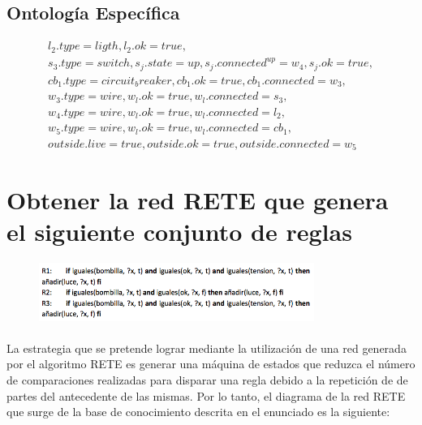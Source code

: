 \documentclass[10pt, a4paper,spanish]{article}
\begin{document}
		\subsection{Ontología Específica}

			\begin{equation*}
				\begin{split}
					l_2.type=ligth, l_2.ok=true, \\
					s_3.type=switch, s_j.state=up, s_j.connected^{up}=w_4, s_j.ok=true, \\
					cb_1.type=circuit_breaker, cb_1.ok=true, cb_1.connected=w_3, \\
					w_3.type=wire, w_l.ok=true, w_l.connected=s_3, \\
					w_4.type=wire, w_l.ok=true, w_l.connected=l_2, \\
					w_5.type=wire, w_l.ok=true, w_l.connected=cb_1, \\
					outside.live=true, outside.ok=true, outside.connected=w_5
				\end{split}
			\end{equation*}

	\section{Obtener la red RETE que genera el siguiente conjunto de reglas}

		\begin{figure}[H]
			\begin{center}
				\includegraphics[width=0.8\textwidth]{rete-exercise}
			\end{center}
		\end{figure}

		\paragraph{}
		La estrategia que se pretende lograr mediante la utilización de una red generada por el algoritmo RETE es generar una máquina de estados que reduzca el número de comparaciones realizadas para disparar una regla debido a la repetición de de partes del antecedente de las mismas. Por lo tanto, el diagrama de la red RETE que surge de la base de conocimiento descrita en el enunciado es la siguiente:
\end{document}
